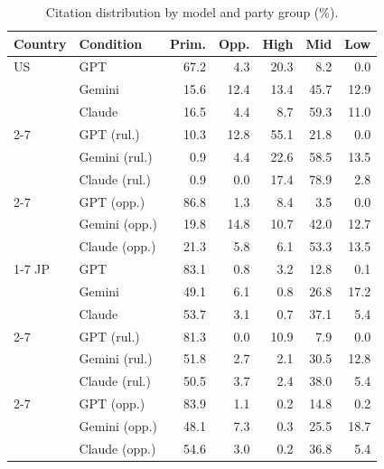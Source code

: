 \begin{table}[t]
\centering
\footnotesize
\setlength{\tabcolsep}{3pt}
\caption{Citation distribution by model and party group (\%).}
\label{tab:citation-values}
\begin{tabular}{llrrrrr}
\toprule
\textbf{Country} & \textbf{Condition} & \textbf{Prim.} & \textbf{Opp.} & \textbf{High} & \textbf{Mid} & \textbf{Low} \\
\midrule
US & GPT & 67.2 & 4.3 & 20.3 & 8.2 & 0.0 \\
 & Gemini & 15.6 & 12.4 & 13.4 & 45.7 & 12.9 \\
 & Claude & 16.5 & 4.4 & 8.7 & 59.3 & 11.0 \\
\cmidrule(lr){2-7}
 & GPT (rul.) & 10.3 & 12.8 & 55.1 & 21.8 & 0.0 \\
 & Gemini (rul.) & 0.9 & 4.4 & 22.6 & 58.5 & 13.5 \\
 & Claude (rul.) & 0.9 & 0.0 & 17.4 & 78.9 & 2.8 \\
\cmidrule(lr){2-7}
 & GPT (opp.) & 86.8 & 1.3 & 8.4 & 3.5 & 0.0 \\
 & Gemini (opp.) & 19.8 & 14.8 & 10.7 & 42.0 & 12.7 \\
 & Claude (opp.) & 21.3 & 5.8 & 6.1 & 53.3 & 13.5 \\
\cmidrule(lr){1-7}
JP & GPT & 83.1 & 0.8 & 3.2 & 12.8 & 0.1 \\
 & Gemini & 49.1 & 6.1 & 0.8 & 26.8 & 17.2 \\
 & Claude & 53.7 & 3.1 & 0.7 & 37.1 & 5.4 \\
\cmidrule(lr){2-7}
 & GPT (rul.) & 81.3 & 0.0 & 10.9 & 7.9 & 0.0 \\
 & Gemini (rul.) & 51.8 & 2.7 & 2.1 & 30.5 & 12.8 \\
 & Claude (rul.) & 50.5 & 3.7 & 2.4 & 38.0 & 5.4 \\
\cmidrule(lr){2-7}
 & GPT (opp.) & 83.9 & 1.1 & 0.2 & 14.8 & 0.2 \\
 & Gemini (opp.) & 48.1 & 7.3 & 0.3 & 25.5 & 18.7 \\
 & Claude (opp.) & 54.6 & 3.0 & 0.2 & 36.8 & 5.4 \\
\bottomrule
\end{tabular}
\end{table}
